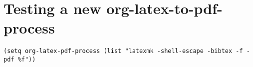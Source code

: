 \documentclass[11pt]{article}
\author{John Kitchin}
\date{\today}
\title{}
\begin{document}
\tableofcontents

\section{Testing a new org-latex-to-pdf-process}
\label{sec:org4817a5f}

\begin{verbatim}
(setq org-latex-pdf-process (list "latexmk -shell-escape -bibtex -f -pdf %f"))
\end{verbatim}

\cite{2006-acs-style-guide,alesi-2012-evaluat-primar}



\end{document}
